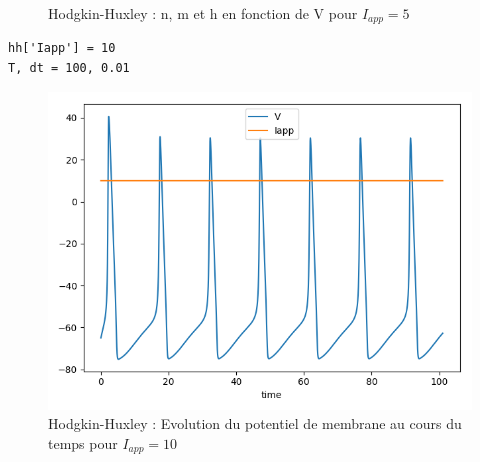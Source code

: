 \documentclass[12pt]{scrartcl}
\begin{document}
\begin{figure}[!h]
\begin{minipage}[l]{.3\linewidth}
\end{minipage}\hfill
\caption{Hodgkin-Huxley : n, m et h en fonction de V pour $I_{app} = 5$}
\label{hh1234}
\end{figure}

\clearpage

\begin{lstlisting}[caption = {Hodgkin-Huxley : Simulation du modèle pour $I_{app} = 10$}]
hh['Iapp'] = 10
T, dt = 100, 0.01
\end{lstlisting}

\begin{figure}[!h]
\centering
\includegraphics[scale=0.4]{imgs/hh21.png}
\caption{Hodgkin-Huxley : Evolution du potentiel de membrane au cours du temps pour $I_{app} = 10$}
\label{hh21}
\end{figure}
\end{document}
